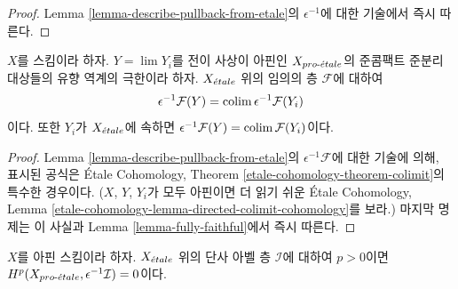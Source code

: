 \begin{proof}
Lemma \ref{lemma-describe-pullback-from-etale}의 $\epsilon^{-1}$에 대한
기술에서 즉시 따른다.
\end{proof}

\begin{lemma}
\label{lemma-limit-pullback}
$X$를 스킴이라 하자. $Y = \lim Y_i$를 전이 사상이 아핀인
$X_{pro\text{-}\acute{e}tale}$의 준콤팩트 준분리 대상들의 유향 역계의 극한이라 하자.
$X_{\acute{e}tale}$ 위의 임의의 층 $\mathcal{F}$에 대하여
$$
\epsilon^{-1}\mathcal{F}(Y) = \mathop{\mathrm{colim}}\nolimits \epsilon^{-1}\mathcal{F}(Y_i)
$$
이다. 또한 $Y_i$가 $X_{\acute{e}tale}$에 속하면
$\epsilon^{-1}\mathcal{F}(Y) = \mathop{\mathrm{colim}}\nolimits \mathcal{F}(Y_i)$이다.
\end{lemma}

\begin{proof}
Lemma \ref{lemma-describe-pullback-from-etale}의
$\epsilon^{-1}\mathcal{F}$에 대한 기술에 의해, 표시된 공식은
\'Etale Cohomology, Theorem
\ref{etale-cohomology-theorem-colimit}의 특수한 경우이다.
($X$, $Y$, $Y_i$가 모두 아핀이면 더 읽기 쉬운 \'Etale Cohomology,
Lemma \ref{etale-cohomology-lemma-directed-colimit-cohomology}를 보라.)
마지막 명제는 이 사실과 Lemma \ref{lemma-fully-faithful}에서 즉시
따른다.
\end{proof}

\begin{lemma}
\label{lemma-affine-vanishing}
$X$를 아핀 스킴이라 하자. $X_{\acute{e}tale}$ 위의 단사 아벨 층
$\mathcal{I}$에 대하여 $p > 0$이면
$H^p(X_{pro\text{-}\acute{e}tale}, \epsilon^{-1}\mathcal{I}) = 0$이다.
\end{lemma}


